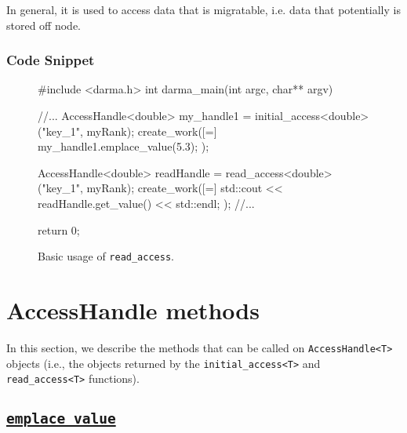 \begin{subs}
In general, it is used to access data that is migratable, i.e. data 
that potentially is stored off node.


\subsubsection{Code Snippet} 
\begin{figure}[!h]
\begin{CppCodeNumb}
#include <darma.h>
int darma_main(int argc, char** argv)
{
	//...
  AccessHandle<double> my_handle1 = initial_access<double>("key_1", myRank);
  create_work([=]{
  	my_handle1.emplace_value(5.3);
  });

  AccessHandle<double> readHandle = read_access<double>("key_1", myRank);
  create_work([=]{
  	std::cout << readHandle.get_value() << std::endl;
  });
  //...

  return 0;
}
\end{CppCodeNumb}
\label{fig:fe_api_initialaccess}
\caption{Basic usage of \texttt{read\_access}.}
\end{figure}

\end{subs}














\clearpage
\section{AccessHandle methods}

In this section, we describe the methods that can be called 
on \texttt{AccessHandle<T>} objects (i.e., the objects returned by the 
\texttt{initial\_access<T>} and \texttt{read\_access<T>} functions).


\subsection{\underline{\texttt{emplace\_value}}}


